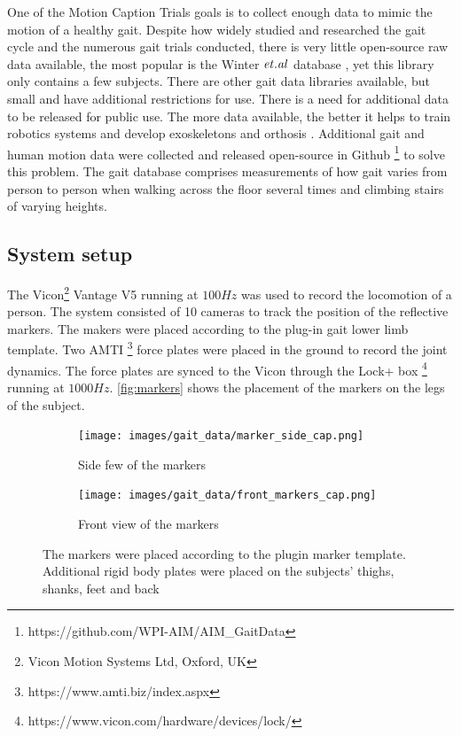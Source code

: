 One of the Motion Caption Trials goals is to collect enough data to mimic the motion of a healthy gait.  Despite how widely studied and researched the gait cycle and the numerous gait trials conducted, there is very little open-source raw data available, the most popular is the Winter $\it{et. al}$ database \cite{winter1991biomechanics}, yet this library only contains a few subjects. There are other gait data libraries available, but small and have additional restrictions for use. There is a need for additional data to be released for public use. The more data available, the better it helps to train robotics systems and develop exoskeletons and orthosis \cite{moore2015elaborate}. Additional gait and human motion data were collected and released open-source in Github \footnote{https://github.com/WPI-AIM/AIM\_GaitData} to solve this problem. The gait database comprises measurements of how gait varies from person to person when walking across the floor several times and climbing stairs of varying heights. 


\subsection{System setup}
\label{sec:setup}
The Vicon\footnote{Vicon Motion Systems Ltd, Oxford, UK}  Vantage V5 running at $100Hz$ was used to record the locomotion of a person. The system consisted of 10 cameras to track the position of the reflective markers. The makers were placed according to the plug-in gait lower limb template. Two AMTI \footnote{https://www.amti.biz/index.aspx} force plates were placed in the ground to record the joint dynamics. The force plates are synced to the Vicon through the Lock+ box \footnote{https://www.vicon.com/hardware/devices/lock/} running at $1000Hz$. \autoref{fig:markers} shows the placement of the markers on the legs of the subject. 



\begin{figure}
\centering 
\begin{subfigure}{0.4\linewidth} 
  \centering 
  \texttt{[image: images/gait\_data/marker\_side\_cap.png]} 
  \caption[Side Marker Placement]{Side few of the markers} 
  \label{fig:markers_side} 
\end{subfigure} 
%
\begin{subfigure}{0.4\linewidth} 
  \centering 
  \texttt{[image: images/gait\_data/front\_markers\_cap.png]} 
  \caption[Front Marker Placement]{Front view of the markers} 
  \label{fig:markers_front} 
\end{subfigure} 
\caption[Marker Placement]{The markers were placed according to the plugin marker template. Additional rigid body plates were placed on the subjects' thighs, shanks, feet and back} 
\label{fig:markers} 

\end{figure} 


